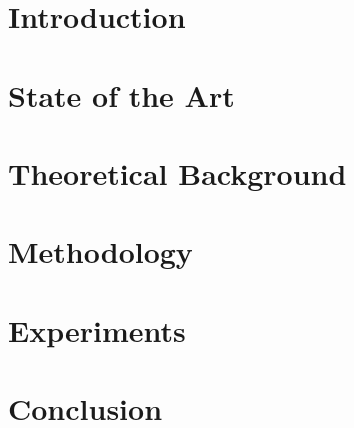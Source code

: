 \documentclass[a4paper]{report}
\begin{document}




\tableofcontents

\listoffigures

\chapter{Introduction}



\chapter{State of the Art}



\chapter{Theoretical Background}



\chapter{Methodology}



\chapter{Experiments}



\chapter{Conclusion}

\appendix

%

\nocite{folco}



\end{document}
